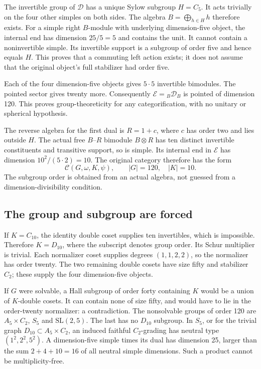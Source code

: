 \documentclass[11pt]{article}
\begin{document}
The invertible group of $\mathcal D$ has a unique Sylow subgroup
$H=C_5$. It acts trivially on the four other simples on both sides.
The algebra $B=\bigoplus_{h\in H}h$ therefore exists. For a simple right
$B$-module with underlying dimension-five object, the internal end has
dimension $25/5=5$ and contains the unit. It cannot contain a noninvertible
simple. Its invertible support is a subgroup of order five and hence
equals $H$. This proves that a commuting left action exists; it does not
assume that the original object's full stabilizer had order five.

Each of the four dimension-five objects gives $5\cdot5$ invertible
bimodules. The pointed sector gives twenty more. Consequently
$\mathcal E={}_B\mathcal D_B$ is pointed of dimension 120. This proves
group-theoreticity for any categorification, with no unitary or spherical
hypothesis.

The reverse algebra for the first dual is $R=1+c$, where $c$ has order two
and lies outside $H$. The actual free $B$--$R$ bimodule $B\otimes R$ has
ten distinct invertible constituents and transitive support, so is simple.
Its internal end in $\mathcal E$ has dimension
$10^2/(5\cdot2)=10$. The original category therefore has the form
\[
\mathcal C(G,\omega,K,\psi),\qquad |G|=120,\quad |K|=10.
\]
The subgroup order is obtained from an actual algebra, not guessed from
a dimension-divisibility condition.

\subsection{The group and subgroup are forced}
If $K=C_{10}$, the identity double coset supplies ten invertibles, which
is impossible. Therefore $K=D_{10}$, where the subscript denotes group
order. Its Schur multiplier is trivial. Each normalizer coset supplies
degrees $(1,1,2,2)$, so the normalizer has order twenty. The two remaining
double cosets have size fifty and stabilizer $C_2$; these supply the four
dimension-five objects.

If $G$ were solvable, a Hall subgroup of order forty containing $K$
would be a union of $K$-double cosets. It can contain none of size fifty,
and would have to lie in the order-twenty normalizer: a contradiction.
The nonsolvable groups of order 120 are $A_5\times C_2$, $S_5$ and
$\mathrm{SL}(2,5)$. The last has no $D_{10}$ subgroup. In $S_5$, or for
the trivial graph $D_{10}\subset A_5\times C_2$, an induced faithful
$C_2$-grading has neutral type $(1^2,2^2,5^2)$. A dimension-five simple
times its dual has dimension 25, larger than the sum $2+4+10=16$ of all
neutral simple dimensions. Such a product cannot be multiplicity-free.
\end{document}
